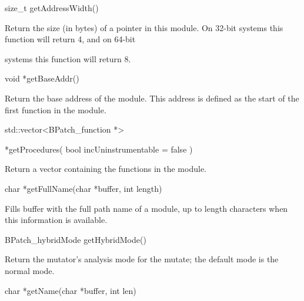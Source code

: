 {{

size_t getAddressWidth()}



{

Return the size (in bytes) of a pointer in this module. On 32-bit systems this function will return 4, and on 64-bit

systems this function will return 8.}



{

void *getBaseAddr()}



{

Return the base address of the module. This address is defined as the start of the first function in the module.}





\bigskip



{

std::vector<BPatch_function *>



{

*getProcedures( bool incUninstrumentable = false )}



{

Return a vector containing the functions in the module.





\bigskip



{

char *getFullName(char *buffer, int length)}



{

Fills buffer with the full path name of a module, up to length characters when this information is available.}



{

BPatch_hybridMode getHybridMode()}



{

Return the mutator's analysis mode for the mutate; the default mode is the normal mode.}



{

char *getName(char *buffer, int len)}



}}}
